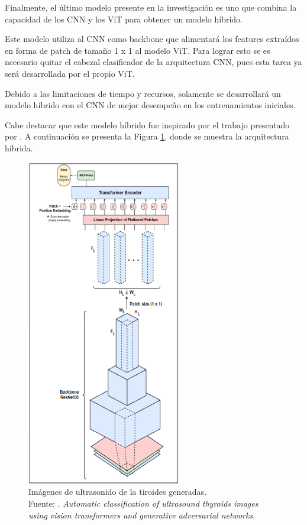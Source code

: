 Finalmente, el último modelo presente en la investigación es uno que combina la capacidad de los CNN y los ViT para obtener un modelo híbrido.

Este modelo utiliza al CNN como backbone que alimentará los features extraídos en forma de patch de tamaño 1 x 1 al modelo ViT. Para lograr esto se es necesario quitar el cabezal clasificador de la arquitectura CNN, pues esta tarea ya será desarrollada por el propio ViT.

Debido a las limitaciones de tiempo y recursos, solamente se desarrollará un modelo híbrido con el CNN de mejor desempeño en los entrenamientos iniciales.

Cabe destacar que este modelo híbrido fue inspirado por el trabajo presentado por \cite{pr_JERBI2023autoclassViTGAN}. A continuación se presenta la Figura \ref{4:fig101}, donde se muestra la arquitectura híbrida.

\begin{figure}[H]
	\begin{center}
		\includegraphics[width=0.60\textwidth]{4/figures/hybrid_arc.png}
		\caption[Imágenes de ultrasonido de la tiroides generadas]{Imágenes de ultrasonido de la tiroides generadas. \\
		Fuente: \cite{pr_JERBI2023autoclassViTGAN}. \textit{Automatic classification of ultrasound thyroids images using vision transformers and generative adversarial networks}.}
		\label{4:fig101}
	\end{center}
\end{figure}

